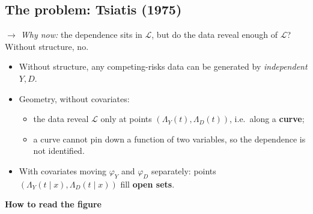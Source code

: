 \documentclass[11pt]{article}
\newcommand{\1}{\mathbf{1}}
\newcommand{\Lap}{\mathcal{L}}
\newcommand{\whynow}[1]{\par\noindent\textit{$\rightarrow$ Why now:} #1\par}
\begin{document}
\subsection{The problem: Tsiatis (1975)}
\whynow{the dependence sits in $\Lap$, but do the data reveal enough of $\Lap$? Without structure, no.}
\begin{itemize}
  \item Without structure, any competing-risks data can be generated by \emph{independent} $Y,D$.
  \item Geometry, without covariates:
    \begin{itemize}
      \item the data reveal $\Lap$ only at points $(\Lambda_Y(t),\Lambda_D(t))$, i.e.\ along a \textbf{curve};
      \item a curve cannot pin down a function of two variables, so the dependence is not identified.
    \end{itemize}
  \item With covariates moving $\varphi_Y$ and $\varphi_D$ separately: points $(\Lambda_Y(t\mid x),\Lambda_D(t\mid x))$ fill \textbf{open sets}.
\end{itemize}
\textbf{How to read the figure}
\end{document}
